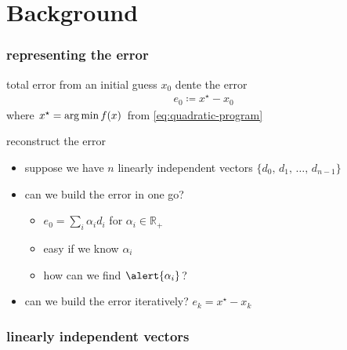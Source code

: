 \documentclass[10pt,dvipsnames*]{beamer}
\begin{document}
\section{Background}%
\label{sec:backgrond}
%
\begin{frame}
  \frametitle{representing the error}
  \pause
  \begin{block}{total error}
    from an initial guess $x_0$ dente the error
    \begin{align}
      \label{eq:error-0}
      e_0 \coloneqq x^{\star} - x_0
    \end{align}
    where $x^{\star} = \operatorname*{arg\,min} f(x)$ from \cref{eq:quadratic-program}
  \end{block}
  \pause
  \begin{block}{reconstruct the error}
    \begin{itemize}
      \item suppose we have $n$ linearly independent vectors $\{d_0,\, d_1,\, \ldots,\, d_{n-1} \}$
      \item can we build the error in one go?
      \begin{itemize}
        \item $e_0 = \sum_i \alpha_i d_i$ for $\alpha_i \in \mathbb{R}_+$
        \item easy if we know $\alpha_i$
        \item \alert{how can we find} $\alert{\alpha_i}$?
      \end{itemize}
      \item can we build the error iteratively? $e_k = x^{\star} - x_k$
    \end{itemize}
  \end{block}
\end{frame}
%
\begin{frame}
  \frametitle{linearly independent vectors}
  \centering {}
\end{frame}
\end{document}
